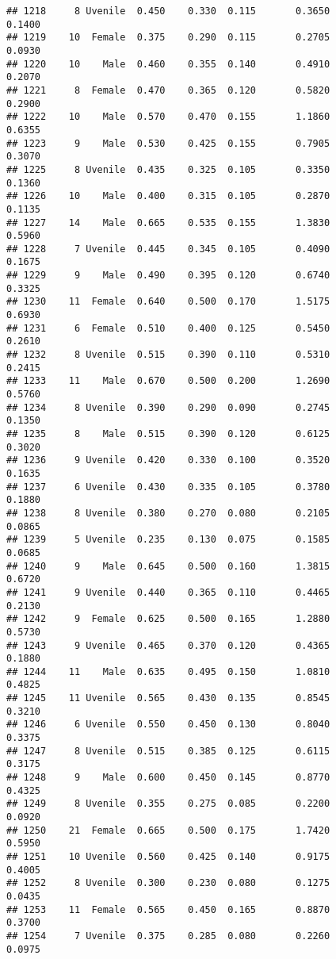 \documentclass[
]{article}
\begin{document}
\begin{verbatim}
## 1218     8 Uvenile  0.450    0.330  0.115       0.3650         0.1400
## 1219    10  Female  0.375    0.290  0.115       0.2705         0.0930
## 1220    10    Male  0.460    0.355  0.140       0.4910         0.2070
## 1221     8  Female  0.470    0.365  0.120       0.5820         0.2900
## 1222    10    Male  0.570    0.470  0.155       1.1860         0.6355
## 1223     9    Male  0.530    0.425  0.155       0.7905         0.3070
## 1225     8 Uvenile  0.435    0.325  0.105       0.3350         0.1360
## 1226    10    Male  0.400    0.315  0.105       0.2870         0.1135
## 1227    14    Male  0.665    0.535  0.155       1.3830         0.5960
## 1228     7 Uvenile  0.445    0.345  0.105       0.4090         0.1675
## 1229     9    Male  0.490    0.395  0.120       0.6740         0.3325
## 1230    11  Female  0.640    0.500  0.170       1.5175         0.6930
## 1231     6  Female  0.510    0.400  0.125       0.5450         0.2610
## 1232     8 Uvenile  0.515    0.390  0.110       0.5310         0.2415
## 1233    11    Male  0.670    0.500  0.200       1.2690         0.5760
## 1234     8 Uvenile  0.390    0.290  0.090       0.2745         0.1350
## 1235     8    Male  0.515    0.390  0.120       0.6125         0.3020
## 1236     9 Uvenile  0.420    0.330  0.100       0.3520         0.1635
## 1237     6 Uvenile  0.430    0.335  0.105       0.3780         0.1880
## 1238     8 Uvenile  0.380    0.270  0.080       0.2105         0.0865
## 1239     5 Uvenile  0.235    0.130  0.075       0.1585         0.0685
## 1240     9    Male  0.645    0.500  0.160       1.3815         0.6720
## 1241     9 Uvenile  0.440    0.365  0.110       0.4465         0.2130
## 1242     9  Female  0.625    0.500  0.165       1.2880         0.5730
## 1243     9 Uvenile  0.465    0.370  0.120       0.4365         0.1880
## 1244    11    Male  0.635    0.495  0.150       1.0810         0.4825
## 1245    11 Uvenile  0.565    0.430  0.135       0.8545         0.3210
## 1246     6 Uvenile  0.550    0.450  0.130       0.8040         0.3375
## 1247     8 Uvenile  0.515    0.385  0.125       0.6115         0.3175
## 1248     9    Male  0.600    0.450  0.145       0.8770         0.4325
## 1249     8 Uvenile  0.355    0.275  0.085       0.2200         0.0920
## 1250    21  Female  0.665    0.500  0.175       1.7420         0.5950
## 1251    10 Uvenile  0.560    0.425  0.140       0.9175         0.4005
## 1252     8 Uvenile  0.300    0.230  0.080       0.1275         0.0435
## 1253    11  Female  0.565    0.450  0.165       0.8870         0.3700
## 1254     7 Uvenile  0.375    0.285  0.080       0.2260         0.0975

\end{verbatim}
\end{document}
